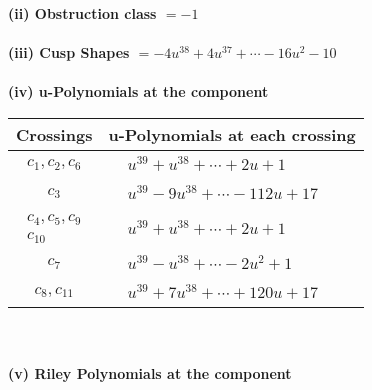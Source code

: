\documentclass[1p]{elsarticle_modified}
\theoremstyle{definition}
\begin{document}
\flushleft \textbf{(ii) Obstruction class $= -1$}\\~\\
\flushleft \textbf{(iii) Cusp Shapes $= -4 u^{38}+4 u^{37}+\cdots-16 u^2-10$}\\~\\
\newpage\renewcommand{\arraystretch}{1}
\flushleft \textbf{(iv) u-Polynomials at the component}\newline \\
\begin{tabular}{m{50pt}|m{274pt}}
Crossings & \hspace{64pt}u-Polynomials at each crossing \\
\hline $$\begin{aligned}c_{1},c_{2},c_{6}\end{aligned}$$&$\begin{aligned}
&u^{39}+u^{38}+\cdots+2 u+1
\end{aligned}$\\
\hline $$\begin{aligned}c_{3}\end{aligned}$$&$\begin{aligned}
&u^{39}-9 u^{38}+\cdots-112 u+17
\end{aligned}$\\
\hline $$\begin{aligned}c_{4},c_{5},c_{9}\\c_{10}\end{aligned}$$&$\begin{aligned}
&u^{39}+u^{38}+\cdots+2 u+1
\end{aligned}$\\
\hline $$\begin{aligned}c_{7}\end{aligned}$$&$\begin{aligned}
&u^{39}- u^{38}+\cdots-2 u^2+1
\end{aligned}$\\
\hline $$\begin{aligned}c_{8},c_{11}\end{aligned}$$&$\begin{aligned}
&u^{39}+7 u^{38}+\cdots+120 u+17
\end{aligned}$\\
\hline
\end{tabular}\\~\\
\newpage\renewcommand{\arraystretch}{1}
\flushleft \textbf{(v) Riley Polynomials at the component}\newline \\
\end{document}
